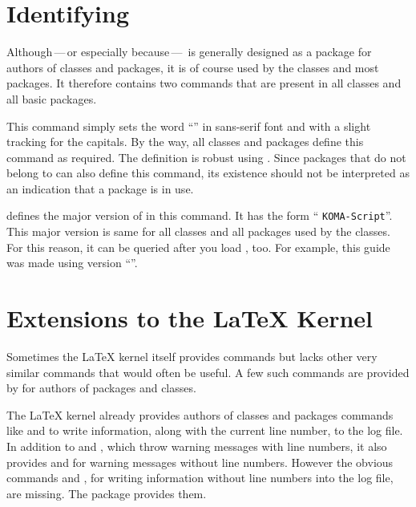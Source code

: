 \section{Identifying \KOMAScript}

Although\,---\,or especially because\,---\, is generally
designed as a package for authors of classes and packages, it is of course
used by the \KOMAScript{} classes and most \KOMAScript{} packages. It
therefore contains two commands that are present in all \KOMAScript{} classes
and all basic \KOMAScript{} packages.

\begin{Declaration}
\end{Declaration}
This command simply sets the word ``\KOMAScript'' in sans-serif font and with
a slight tracking for the capitals. By the way, all \KOMAScript{} classes and
packages define this command as required. The definition is robust using
. Since packages that do not belong to
\KOMAScript{} can also define this command, its existence should not be
interpreted as an indication that a \KOMAScript{} package is in use.%
\EndIndexGroup


\begin{Declaration}
\end{Declaration}
\KOMAScript{} defines the major version of \KOMAScript{} in this command. It
has the form ``  \texttt{KOMA-Script}''. This major
version is same for all \KOMAScript{} classes and all \KOMAScript{} packages
used by the classes. For this reason, it can be queried after you
load , too. For example, this guide was made using
\KOMAScript{} version ``\KOMAScriptVersion''.
%
\EndIndexGroup


\section{Extensions to the \LaTeX{} Kernel}

Sometimes the \LaTeX{} kernel itself provides commands but lacks other very
similar commands that would often be useful. A few such commands are provided
by  for authors of packages and classes.

\begin{Declaration}
\end{Declaration}%
The \LaTeX{} kernel already provides authors of classes and packages commands
like  and  to write information, along
with the current line number, to the log file. In addition to
 and , which throw warning messages
with line numbers, it also provides  and
 for warning messages without line numbers. However
the obvious commands  and ,
for writing information without line numbers into the log file, are missing.
The  package provides them.
%
\EndIndexGroup


